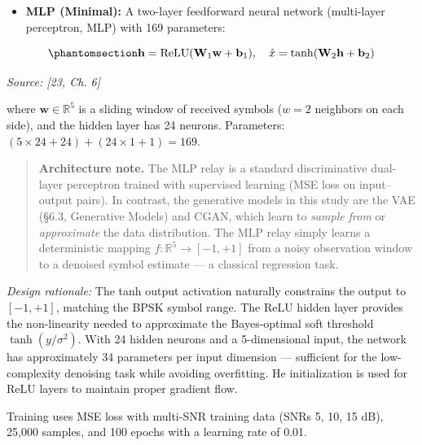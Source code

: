 \begin{itemize}
\tightlist
\item
  \textbf{MLP (Minimal):} A two-layer feedforward neural network (multi-layer perceptron, MLP) with 169 parameters:
\end{itemize}

\begin{equation}\protect\phantomsection\label{eq:mlp-relay}{\mathbf{h} = \text{ReLU}(\mathbf{W}_1 \mathbf{w} + \mathbf{b}_1), \quad \hat{x} = \tanh(\mathbf{W}_2 \mathbf{h} + \mathbf{b}_2)
}\end{equation} \par{\small\textit{Source: [23, Ch. 6]}}

where \(\mathbf{w} \in \mathbb{R}^5\) is a sliding window of received symbols (\(w=2\) neighbors on each side), and the hidden layer has 24 neurons. Parameters: \((5 \times 24 + 24) + (24 \times 1 + 1) = 169\).

\begin{quote}
\textbf{Architecture note.} The MLP relay is a standard discriminative dual-layer perceptron trained with supervised learning (MSE loss on input--output pairs). In contrast, the generative models in this study are the VAE (§6.3, Generative Models) and CGAN, which learn to \emph{sample from} or \emph{approximate} the data distribution. The MLP relay simply learns a deterministic mapping \(f: \mathbb{R}^5 \to [-1,+1]\) from a noisy observation window to a denoised symbol estimate --- a classical regression task.
\end{quote}

\emph{Design rationale:} The tanh output activation naturally constrains the output to \([-1, +1]\), matching the BPSK symbol range. The ReLU hidden layer provides the non-linearity needed to approximate the Bayes-optimal soft threshold \(\tanh(y/\sigma^2)\). With 24 hidden neurons and a 5-dimensional input, the network has approximately 34 parameters per input dimension --- sufficient for the low-complexity denoising task while avoiding overfitting. He initialization is used for ReLU layers to maintain proper gradient flow.

Training uses MSE loss with multi-SNR training data (SNRs 5, 10, 15 dB), 25,000 samples, and 100 epochs with a learning rate of 0.01.

